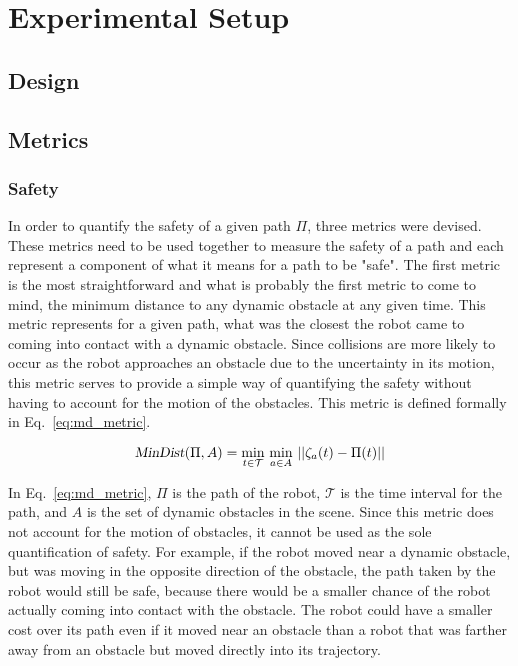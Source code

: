 


\chapter{Experimental Setup}

\label{chapter:experimentalsetup}

\section{Design}

\section{Metrics}

\subsection{Safety}

In order to quantify the safety of a given path $\Pi$, three metrics were
devised. These metrics need to be used together to measure the safety of a path
and each represent a component of what it means for a path to be "safe". The
first metric is the most straightforward and what is probably the first metric
to come to mind, the minimum distance to any dynamic obstacle at any given
time. This metric represents for a given path, what was the closest the robot
came to coming into contact with a dynamic obstacle. Since collisions are more
likely to occur as the robot approaches an obstacle due to the uncertainty in
its motion, this metric serves to provide a simple way of quantifying the
safety without having to account for the motion of the obstacles. This metric
is defined formally in Eq.~\ref{eq:md_metric}.

\begin{equation}
    \Var{MinDist}(\Pi, A) = \min_{t \in \mathcal{T}} \, \min_{a \in A} \,
    ||\zeta_a(t) - \Pi(t)||
    \label{eq:md_metric}
\end{equation}

In Eq.~\ref{eq:md_metric}, $\Pi$ is the path of the robot, $\mathcal{T}$ is the
time interval for the path, and $A$ is the set of dynamic obstacles in the
scene. Since this metric does not account for the motion of obstacles, it
cannot be used as the sole quantification of safety. For example, if the robot
moved near a dynamic obstacle, but was moving in the opposite direction of the
obstacle, the path taken by the robot would still be safe, because there would
be a smaller chance of the robot actually coming into contact with the
obstacle. The robot could have a smaller cost over its path even if it moved
near an obstacle than a robot that was farther away from an obstacle but moved
directly into its trajectory.

